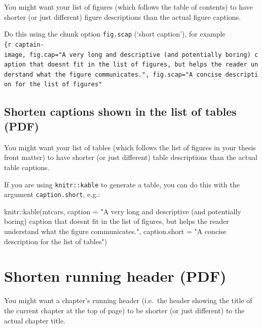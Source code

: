 \documentclass[a4paper, nobind]{templates/ociamthesis}
\newenvironment{Shaded}{\begin{snugshade}}{\end{snugshade}}
\newcommand{\AttributeTok}[1]{\textcolor[rgb]{0.77,0.63,0.00}{#1}}
\newcommand{\FunctionTok}[1]{\textcolor[rgb]{0.00,0.00,0.00}{#1}}
\newcommand{\NormalTok}[1]{#1}
\newcommand{\SpecialCharTok}[1]{\textcolor[rgb]{0.00,0.00,0.00}{#1}}
\newcommand{\StringTok}[1]{\textcolor[rgb]{0.31,0.60,0.02}{#1}}
\renewenvironment{Shaded}
{
  \vspace{10pt}%
  \begin{snugshade}%
}{%
  \end{snugshade}%
  \vspace{8pt}%
}
\begin{document}
You might want your list of figures (which follows the table of contents) to have shorter (or just different) figure descriptions than the actual figure captions.

Do this using the chunk option \texttt{fig.scap} (`short caption'), for example \texttt{\{r\ captain-image,\ fig.cap="A\ very\ long\ and\ descriptive\ (and\ potentially\ boring)\ caption\ that\ doesn\textquotesingle{}t\ fit\ in\ the\ list\ of\ figures,\ but\ helps\ the\ reader\ understand\ what\ the\ figure\ communicates.",\ fig.scap="A\ concise\ description\ for\ the\ list\ of\ figures"}

\hypertarget{shorten-captions-shown-in-the-list-of-tables-pdf}{%
\subsection{Shorten captions shown in the list of tables (PDF)}\label{shorten-captions-shown-in-the-list-of-tables-pdf}}

You might want your list of tables (which follows the list of figures in your thesis front matter) to have shorter (or just different) table descriptions than the actual table captions.

If you are using \texttt{knitr::kable} to generate a table, you can do this with the argument \texttt{caption.short}, e.g.:

\begin{Shaded}
\begin{Highlighting}[]
\NormalTok{knitr}\SpecialCharTok{::}\FunctionTok{kable}\NormalTok{(mtcars,}
              \AttributeTok{caption =} \StringTok{"A very long and descriptive (and potentially}
\StringTok{              boring) caption that doesn\textquotesingle{}t fit in the list of figures,}
\StringTok{              but helps the reader understand what the figure }
\StringTok{              communicates."}\NormalTok{,}
              \AttributeTok{caption.short =} \StringTok{"A concise description for the list of tables"}\NormalTok{)}
\end{Highlighting}
\end{Shaded}

\hypertarget{shorten-running-header-pdf}{%
\section{Shorten running header (PDF)}\label{shorten-running-header-pdf}}

You might want a chapter's running header (i.e.~the header showing the title of the current chapter at the top of page) to be shorter (or just different) to the actual chapter title.
\end{document}
